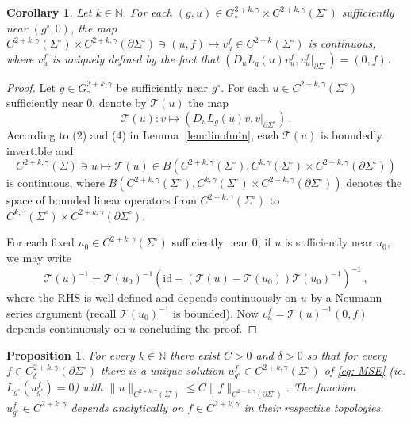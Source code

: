 \documentclass[11pt]{amsart}
\newtheorem{Corollary}[Theorem]{Corollary}
\newtheorem{Proposition}[Theorem]{Proposition}
\theoremstyle{definition}
\numberwithin{equation}{section}
\newcommand{\norm}[1]{\lVert #1 \rVert}         %
\newcommand{\p}{\partial}
\begin{document}
\begin{Corollary}\label{cor:contDependenceOfStabilitySol}
    Let $k\in \mathbb{N}$. For each $(g,u) \in G_\circ^{3+k,\gamma}\times C^{2+k,\gamma}(\Sigma^\circ)$ sufficiently near $(g^\circ,0)$, the map $C^{2+k,\gamma}(\Sigma^\circ)\times C^{2+k,\gamma}(\p\Sigma^\circ) \ni (u,f) \mapsto v^f_u \in C^{2+k}(\Sigma^\circ)$ is continuous, where $v^f_u$ is uniquely defined by the fact that $(D_u L_{g}(u)v^f_u,v^f_u\vert_{\p\Sigma^\circ})=(0,f)$. 
\end{Corollary}
\begin{proof}
    Let $g \in G_\circ^{3+k,\gamma}$ be sufficiently near $g^\circ$. For each $u \in C^{2+k,\gamma}(\Sigma^\circ)$ sufficiently near $0$, denote by $\mathcal{T}(u)$ the map
    \[
        \mathcal{T}(u)\colon v\mapsto (D_u L_g(u)v,v\vert_{\p\Sigma^\circ})\,.
    \]
    According to (2) and (4) in Lemma~\ref{lem:linofmin}, each $\mathcal{T}(u)$ is boundedly invertible and 
    \[
        C^{2+k,\gamma}(\Sigma) \ni u \mapsto \mathcal{T}(u) \in B(C^{2+k,\gamma}(\Sigma^\circ),C^{k,\gamma}(\Sigma^\circ)\times C^{2+k,\gamma}(\partial\Sigma^\circ))
    \]
    is continuous, where $B(C^{2+k,\gamma}(\Sigma^\circ),C^{k,\gamma}(\Sigma^\circ)\times C^{2+k,\gamma}(\partial\Sigma^\circ))$ denotes the space of bounded linear operators from $C^{2+k,\gamma}(\Sigma^\circ)$ to $C^{k,\gamma}(\Sigma^\circ)\times C^{2+k,\gamma}(\partial\Sigma^\circ)$. 

    For each fixed $u_0 \in C^{2+k,\gamma}(\Sigma^\circ)$ sufficiently near $0$, if $u$ is sufficiently near $u_0$, we may write 
    \[
        \mathcal{T}(u)^{-1} = \mathcal{T}(u_0)^{-1}(\mathrm{id}+(\mathcal{T}(u)-\mathcal{T}(u_0))\mathcal{T}(u_0)^{-1})^{-1}\,,
    \]
    where the RHS is well-defined and depends continuously on $u$ by a Neumann series argument (recall $\mathcal{T}(u_0)^{-1}$ is bounded). Now $v^f_u = \mathcal{T}(u)^{-1}(0,f)$ depends continuously on $u$ concluding the proof.
\end{proof}

\begin{Proposition}
\label{prop: smooth dependence of solution}
For every $k\in\mathbb{N}$ there exist $C>0$ and $\delta>0$ so that for every $f\in C^{2+k,\gamma}_\delta(\partial\Sigma^\circ)$ there is a unique solution $u_{g^\circ}^f \in C^{2+k,\gamma}(\Sigma^\circ)$ of \eqref{eq: MSE} (ie. $L_{g^\circ}(u^f_{g^\circ})=0$) with $\norm{u}_{C^{2+k,\gamma}(\Sigma^\circ)}\leq C\norm{f}_{C^{2+k,\gamma}(\partial\Sigma^\circ)}$. The function $u^f_{g^\circ} \in C^{2+k,\gamma}$ depends analytically on $f\in C^{2+k,\gamma}$ in their respective topologies.
\end{Proposition}
\end{document}

